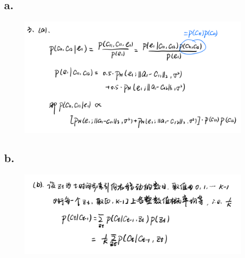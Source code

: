 \documentclass{article}
\begin{document}
\subsection*{a.}
\begin{figure}[H]
    \centering
    \includegraphics[scale=0.5]{3a.png}
\end{figure}
\subsection*{b.}
\begin{figure}[H]
    \centering
    \includegraphics[scale=0.5]{3b.png}
\end{figure}
\end{document}
